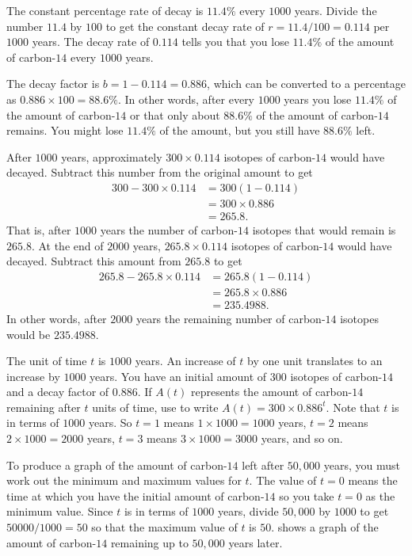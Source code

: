 \documentclass[a4paper,oneside,12pt]{article}
\begin{document}
\begin{solution}
The constant percentage rate of decay is $11.4\%$ every $1000$ years.
Divide the number $11.4$ by $100$ to get the constant decay rate of
$r = 11.4 / 100 = 0.114$ per $1000$ years.  The decay rate of $0.114$
tells you that you lose $11.4\%$ of the amount of carbon-$14$ every
$1000$ years.

The decay factor is $b = 1 - 0.114 = 0.886$, which can be converted to
a percentage as $0.886 \times 100 = 88.6\%$.  In other words, after
every $1000$ years you lose $11.4\%$ of the amount of carbon-$14$ or
that only about $88.6\%$ of the amount of carbon-$14$ remains.  You
might lose $11.4\%$ of the amount, but you still have $88.6\%$ left.

After $1000$ years, approximately $300 \times 0.114$ isotopes of
carbon-$14$ would have decayed.  Subtract this number from the
original amount to get
\begin{align*}
300 - 300 \times 0.114
&=
300 (1 - 0.114) \\[4pt]
&=
300 \times 0.886 \\[4pt]
&=
265.8.
\end{align*}
That is, after $1000$ years the number of carbon-$14$ isotopes that
would remain is $265.8$.  At the end of $2000$ years,
$265.8 \times 0.114$ isotopes of carbon-$14$ would have decayed.
Subtract this amount from $265.8$ to get
\begin{align*}
265.8 - 265.8 \times 0.114
&=
265.8 (1 - 0.114) \\[4pt]
&=
265.8 \times 0.886 \\[4pt]
&=
235.4988.
\end{align*}
In other words, after $2000$ years the remaining number of carbon-$14$
isotopes would be $235.4988$.

The unit of time $t$ is $1000$ years.  An increase of $t$ by one unit
translates to an increase by $1000$ years.  You have an initial amount
of $300$ isotopes of carbon-$14$ and a decay factor of $0.886$.  If
$A(t)$ represents the amount of carbon-$14$ remaining after $t$ units
of time, use  to write
$A(t) = 300 \times 0.886^t$.  Note that $t$ is in terms of $1000$
years.  So $t = 1$ means $1 \times 1000 = 1000$ years, $t = 2$ means
$2 \times 1000 = 2000$ years, $t = 3$ means $3 \times 1000 = 3000$
years, and so on.

To produce a graph of the amount of carbon-$14$ left after $50,000$
years, you must work out the minimum and maximum values for $t$.  The
value of $t = 0$ means the time at which you have the initial amount
of carbon-$14$ so you take $t = 0$ as the minimum value.  Since $t$ is
in terms of $1000$ years, divide $50,000$ by $1000$ to get
$50000 / 1000 = 50$ so that the maximum value of $t$ is $50$.
 shows a graph of the amount of
carbon-$14$ remaining up to $50,000$ years later.
\end{solution}
\end{document}
